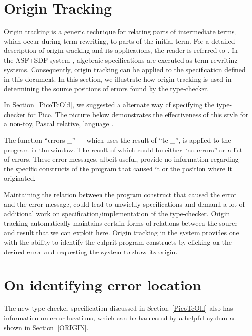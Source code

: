 %

\section{\label{ORIGIN}Origin Tracking}

Origin tracking is a generic technique for relating parts
of intermediate terms, which occur during term rewriting, to parts
of the initial term. For a detailed description of origin tracking
and its applications, the reader is referred to \cite{DKT92}.
In the ASF+SDF system \cite{Kli93}, algebraic specifications
are executed as term rewriting systems. Consequently, origin tracking 
can be applied to the specification defined in this document. 
In this section, we illustrate how origin tracking is used in
determining the source positions of errors found by the type-checker.

In Section~\ref{PicoTcOld}, we suggested a alternate way
of specifying the type-checker for Pico.
The picture below demonstrates the effectiveness of this style 
for a non-toy, Pascal relative, language \clax.

\vspace{0.5 cm}

\centerline{}

The function ``errors \_'' --- which uses the result of ``tc \_'',
is applied to the program in the window. 
The result of which could be either ``no-errors'' or a list of errors.
These error messages, albeit useful, provide no information
regarding the specific constructs of the program that
caused it or the position where it originated.

Maintaining the relation between the program
construct that caused the error and the error message, could
lead to unwieldy specifications and demand a lot of additional
work on specification/implementation of the type-checker.
Origin tracking automatically maintains certain forms of
relations between the source and result that we can
exploit here. 
Origin tracking in the system provides one with the ability 
to identify the culprit program
constructs by clicking on the desired error and requesting
the system to show its origin. 


\section{\label{IERR}On identifying error location}

The new type-checker specification discussed in
Section~\ref{PicoTcOld} also has information on error locations, which can
be harnessed by a helpful system as shown in Section~\ref{ORIGIN}. 

